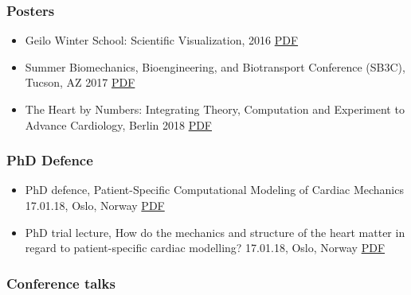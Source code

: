 \documentclass[11pt, a4paper]{article}
\begin{document}
\begin{raggedright}
\hypertarget{posters}{%
\subsubsection{Posters}\label{posters}}

\begin{itemize}
\item
  Geilo Winter School: Scientific Visualization, 2016
  \href{/assets/posters/geilo_winter_school_2016.pdf}{PDF}
\item
  Summer Biomechanics, Bioengineering, and Biotransport Conference
  (SB3C), Tucson, AZ 2017 \href{/assets/posters/sb3c_2017.pdf}{PDF}
\item
  The Heart by Numbers: Integrating Theory, Computation and Experiment
  to Advance Cardiology, Berlin 2018
  \href{/assets/posters/heart_by_numbers_2018.pdf}{PDF}
\end{itemize}

\hypertarget{phd-defence}{%
\subsubsection{PhD Defence}\label{phd-defence}}

\begin{itemize}
\item
  PhD defence, Patient-Specific Computational Modeling of Cardiac
  Mechanics 17.01.18, Oslo, Norway \href{/assets/talks/defence.pdf}{PDF}
\item
  PhD trial lecture, How do the mechanics and structure of the heart
  matter in regard to patient-specific cardiac modelling? 17.01.18,
  Oslo, Norway \href{/assets/talks/trial_lecture.pdf}{PDF}
\end{itemize}

\hypertarget{conference-talks}{%
\subsubsection{Conference talks}\label{conference-talks}}


\end{raggedright}
\end{document}
